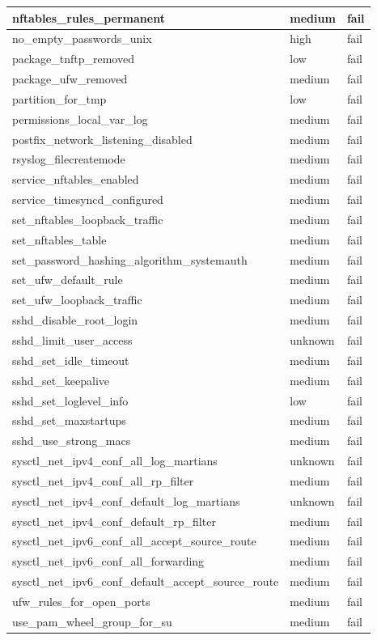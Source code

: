 \begin{longtable}{|p{10cm}|p{2cm}|p{2cm}|}
\hline
nftables\_rules\_permanent & medium & fail \\
\hline
no\_empty\_passwords\_unix & high & fail \\
\hline
package\_tnftp\_removed & low & fail \\
\hline
package\_ufw\_removed & medium & fail \\
\hline
partition\_for\_tmp & low & fail \\
\hline
permissions\_local\_var\_log & medium & fail \\
\hline
postfix\_network\_listening\_disabled & medium & fail \\
\hline
rsyslog\_filecreatemode & medium & fail \\
\hline
service\_nftables\_enabled & medium & fail \\
\hline
service\_timesyncd\_configured & medium & fail \\
\hline
set\_nftables\_loopback\_traffic & medium & fail \\
\hline
set\_nftables\_table & medium & fail \\
\hline
set\_password\_hashing\_algorithm\_systemauth & medium & fail \\
\hline
set\_ufw\_default\_rule & medium & fail \\
\hline
set\_ufw\_loopback\_traffic & medium & fail \\
\hline
sshd\_disable\_root\_login & medium & fail \\
\hline
sshd\_limit\_user\_access & unknown & fail \\
\hline
sshd\_set\_idle\_timeout & medium & fail \\
\hline
sshd\_set\_keepalive & medium & fail \\
\hline
sshd\_set\_loglevel\_info & low & fail \\
\hline
sshd\_set\_maxstartups & medium & fail \\
\hline
sshd\_use\_strong\_macs & medium & fail \\
\hline
sysctl\_net\_ipv4\_conf\_all\_log\_martians & unknown & fail \\
\hline
sysctl\_net\_ipv4\_conf\_all\_rp\_filter & medium & fail \\
\hline
sysctl\_net\_ipv4\_conf\_default\_log\_martians & unknown & fail \\
\hline
sysctl\_net\_ipv4\_conf\_default\_rp\_filter & medium & fail \\
\hline
sysctl\_net\_ipv6\_conf\_all\_accept\_source\_route & medium & fail \\
\hline
sysctl\_net\_ipv6\_conf\_all\_forwarding & medium & fail \\
\hline
sysctl\_net\_ipv6\_conf\_default\_accept\_source\_route & medium & fail \\
\hline
ufw\_rules\_for\_open\_ports & medium & fail \\
\hline
use\_pam\_wheel\_group\_for\_su & medium & fail \\
\hline
\end{longtable}